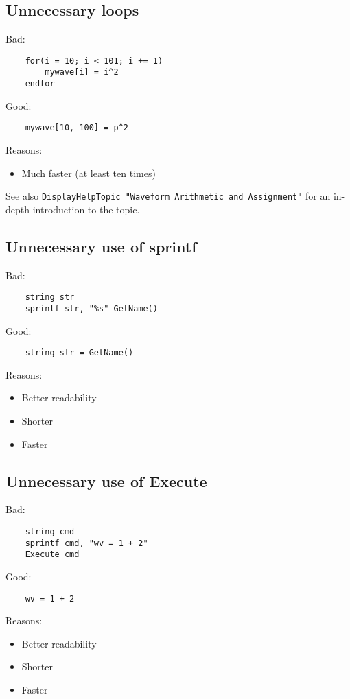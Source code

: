 \documentclass{scrartcl}
\begin{document}
\subsection{Unnecessary loops}
Bad:
\begin{verbatim}
	for(i = 10; i < 101; i += 1)
		mywave[i] = i^2
	endfor
\end{verbatim}
Good:
\begin{verbatim}
	mywave[10, 100] = p^2
\end{verbatim}
Reasons:
\begin{itemize}
	\item Much faster (at least ten times)
\end{itemize}
See also \texttt{DisplayHelpTopic "Waveform Arithmetic and Assignment"} for an in-depth introduction to the topic.
%
\subsection{Unnecessary use of sprintf}
Bad:
\begin{verbatim}
	string str
	sprintf str, "%s" GetName()
\end{verbatim}
Good:
\begin{verbatim}
	string str = GetName()
\end{verbatim}
Reasons:
\begin{itemize}
  \item Better readability
  \item Shorter
  \item Faster
\end{itemize}
%
\subsection{Unnecessary use of Execute}
Bad:
\begin{verbatim}
	string cmd
	sprintf cmd, "wv = 1 + 2"
	Execute cmd
\end{verbatim}
Good:
\begin{verbatim}
	wv = 1 + 2
\end{verbatim}
\pagebreak
Reasons:
\begin{itemize}
  \item Better readability
  \item Shorter
  \item Faster
\end{itemize}
%
\end{document}
